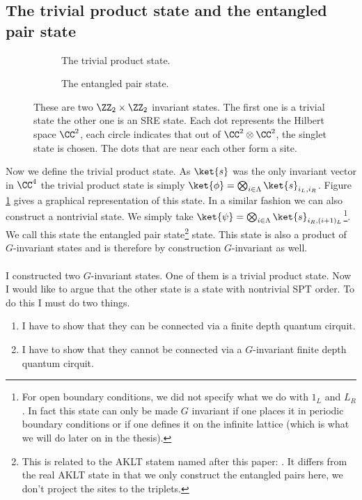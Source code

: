 \subsection{The trivial product state and the entangled pair state}
\begin{figure}
	\centering
	\begin{subfigure}{\textwidth}
		\centering
		
		\caption{The trivial product state.}
		\label{fig:TrivialProductState}
	\end{subfigure}
	\begin{subfigure}{\textwidth}
		\centering
		
		\caption{The entangled pair state.}
		\label{fig:FakeAKLT_State}
	\end{subfigure}
	\caption{These are two $\ZZ_2\times\ZZ_2$ invariant states. The first one is a trivial state the other one is an SRE state. Each dot represents the Hilbert space $\CC^2$, each circle indicates that out of $\CC^2\otimes\CC^2$, the singlet state is chosen. The dots that are near each other form a site.}
	\label{fig:TheTwoHaldanePhases}
\end{figure}
Now we define the trivial product state. As $\ket{s}$ was the only invariant vector in $\CC^4$ the trivial product state is simply $\ket{\phi}=\bigotimes_{i\in\Lambda}\ket{s}_{i_L,i_R}$. Figure \ref{fig:TrivialProductState} gives a graphical representation of this state. In a similar fashion we can also construct a nontrivial state. We simply take $\ket{\psi}=\bigotimes_{i\in\Lambda}\ket{s}_{i_R,(i+1)_L}$\footnote{For open boundary conditions, we did not specify what we do with $1_L$ and $L_R$. In fact this state can only be made $G$ invariant if one places it in periodic boundary conditions or if one defines it on the infinite lattice (which is what we will do later on in the thesis).}. We call this state the entangled pair state\footnote{This is related to the AKLT statem named after this paper: \cite{PhysRevLett.59.799}. It differs from the real AKLT state in that we only construct the entangled pairs here, we don't project the sites to the triplets.} state. This state is also a product of $G$-invariant states and is therefore by construction $G$-invariant as well.\\\\
I constructed two $G$-invariant states. One of them is a trivial product state. Now I would like to argue that the other state is a state with nontrivial SPT order. To do this I must do two things.
\begin{enumerate}
	\item I have to show that they can be connected via a finite depth quantum cirquit.
	\item I have to show that they cannot be connected via a $G$-invariant finite depth quantum cirquit.
\end{enumerate}
